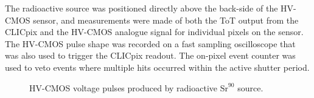 The radioactive source was positioned directly above the back-side of the HV-CMOS sensor, and measurements were made of both the ToT output from the CLICpix and the HV-CMOS analogue signal for individual pixels on the sensor.  The HV-CMOS pulse shape was recorded on a fast sampling oscilloscope that was also used to trigger the CLICpix readout.  The on-pixel event counter was used to veto events where multiple hits occurred within the active shutter period.  

\begin{figure}
\centering
{}
\hfill
{}
\caption[HV-CMOS voltage pulses produced by radioactive $\text{Sr}^{90}$ source.]{HV-CMOS voltage pulses produced by radioactive $\text{Sr}^{90}$ source.}
\label{fig:pulseshapes}
\end{figure}

